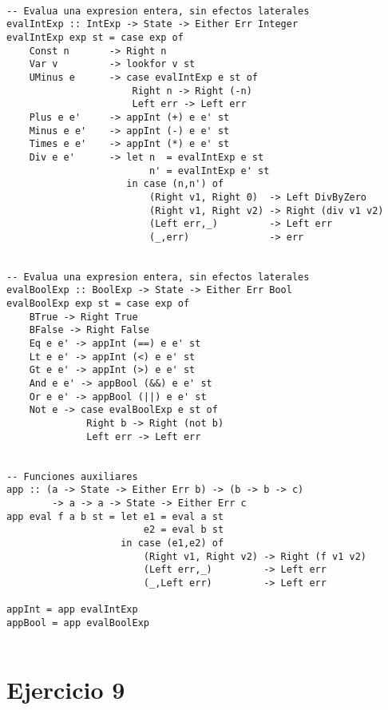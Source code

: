 \documentclass[12pt,a4paper]{article}
\begin{document}
\begin{verbatim}

-- Evalua una expresion entera, sin efectos laterales
evalIntExp :: IntExp -> State -> Either Err Integer
evalIntExp exp st = case exp of
    Const n       -> Right n
    Var v         -> lookfor v st
    UMinus e      -> case evalIntExp e st of
                      Right n -> Right (-n)
                      Left err -> Left err
    Plus e e'     -> appInt (+) e e' st
    Minus e e'    -> appInt (-) e e' st
    Times e e'    -> appInt (*) e e' st
    Div e e'      -> let n  = evalIntExp e st
                         n' = evalIntExp e' st
                     in case (n,n') of
                         (Right v1, Right 0)  -> Left DivByZero
                         (Right v1, Right v2) -> Right (div v1 v2)
                         (Left err,_)         -> Left err
                         (_,err)              -> err


-- Evalua una expresion entera, sin efectos laterales
evalBoolExp :: BoolExp -> State -> Either Err Bool
evalBoolExp exp st = case exp of
    BTrue -> Right True
    BFalse -> Right False
    Eq e e' -> appInt (==) e e' st 
    Lt e e' -> appInt (<) e e' st 
    Gt e e' -> appInt (>) e e' st 
    And e e' -> appBool (&&) e e' st
    Or e e' -> appBool (||) e e' st
    Not e -> case evalBoolExp e st of
              Right b -> Right (not b)
              Left err -> Left err


-- Funciones auxiliares
app :: (a -> State -> Either Err b) -> (b -> b -> c)
        -> a -> a -> State -> Either Err c
app eval f a b st = let e1 = eval a st
                        e2 = eval b st
                    in case (e1,e2) of
                        (Right v1, Right v2) -> Right (f v1 v2)
                        (Left err,_)         -> Left err
                        (_,Left err)         -> Left err

appInt = app evalIntExp
appBool = app evalBoolExp


\end{verbatim}

\bigskip
\section*{Ejercicio 9}
\end{document}
